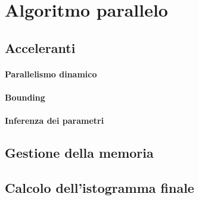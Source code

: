 \section{Algoritmo parallelo}

\subsection{Acceleranti}

\paragraph{Parallelismo dinamico}

\paragraph{Bounding}

\paragraph{Inferenza dei parametri}

\subsection{Gestione della memoria}

\subsection{Calcolo dell'istogramma finale}
